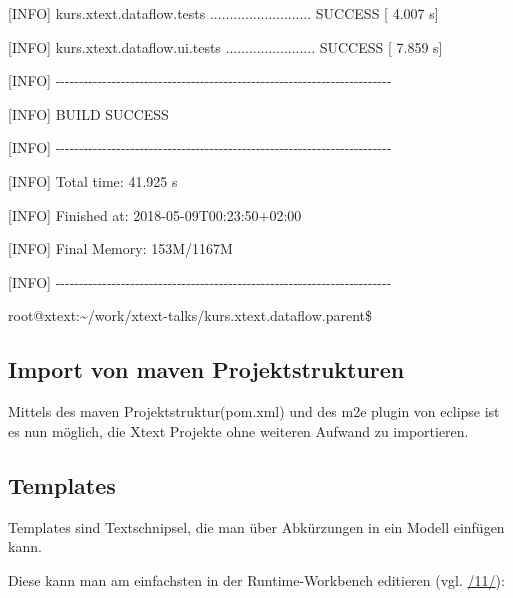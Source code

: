 \documentclass[]{article}
\begin{document}
{[}INFO{]} kurs.xtext.dataflow.tests .......................... SUCCESS
{[} 4.007 s{]}

{[}INFO{]} kurs.xtext.dataflow.ui.tests ....................... SUCCESS
{[} 7.859 s{]}

{[}INFO{]}
-\/-\/-\/-\/-\/-\/-\/-\/-\/-\/-\/-\/-\/-\/-\/-\/-\/-\/-\/-\/-\/-\/-\/-\/-\/-\/-\/-\/-\/-\/-\/-\/-\/-\/-\/-\/-\/-\/-\/-\/-\/-\/-\/-\/-\/-\/-\/-\/-\/-\/-\/-\/-\/-\/-\/-\/-\/-\/-\/-\/-\/-\/-\/-\/-\/-\/-\/-\/-\/-\/-\/-

{[}INFO{]} BUILD SUCCESS

{[}INFO{]}
-\/-\/-\/-\/-\/-\/-\/-\/-\/-\/-\/-\/-\/-\/-\/-\/-\/-\/-\/-\/-\/-\/-\/-\/-\/-\/-\/-\/-\/-\/-\/-\/-\/-\/-\/-\/-\/-\/-\/-\/-\/-\/-\/-\/-\/-\/-\/-\/-\/-\/-\/-\/-\/-\/-\/-\/-\/-\/-\/-\/-\/-\/-\/-\/-\/-\/-\/-\/-\/-\/-\/-

{[}INFO{]} Total time: 41.925 s

{[}INFO{]} Finished at: 2018-05-09T00:23:50+02:00

{[}INFO{]} Final Memory: 153M/1167M

{[}INFO{]}
-\/-\/-\/-\/-\/-\/-\/-\/-\/-\/-\/-\/-\/-\/-\/-\/-\/-\/-\/-\/-\/-\/-\/-\/-\/-\/-\/-\/-\/-\/-\/-\/-\/-\/-\/-\/-\/-\/-\/-\/-\/-\/-\/-\/-\/-\/-\/-\/-\/-\/-\/-\/-\/-\/-\/-\/-\/-\/-\/-\/-\/-\/-\/-\/-\/-\/-\/-\/-\/-\/-\/-

root@xtext:\textasciitilde{}/work/xtext-talks/kurs.xtext.dataflow.parent\$

\subsection[Import von maven
Projektstrukturen]{\texorpdfstring{\protect\hypertarget{anchor-52}{}{}Import
von maven
Projektstrukturen}{Import von maven Projektstrukturen}}\label{import-von-maven-projektstrukturen}

Mittels des maven Projektstruktur(pom.xml) und des m2e plugin von
eclipse ist es nun möglich, die Xtext Projekte ohne weiteren Aufwand zu
importieren.

\subsection[Templates]{\texorpdfstring{\protect\hypertarget{anchor-53}{}{}Templates}{Templates}}\label{templates}

Templates sind Textschnipsel, die man über Abkürzungen in ein Modell
einfügen kann.

Diese kann man am einfachsten in der Runtime-Workbench editieren (vgl.
\protect\hyperlink{anchor-13}{/11/}):
\end{document}
